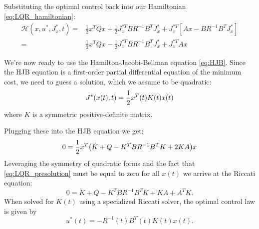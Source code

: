 \documentclass[../root.tex]{subfiles}
\begin{document}
        Substituting the optimal control back into our Hamiltonian \eqref{eq:LQR_hamiltonian}:
        \begin{equation}
            \begin{aligned}
                \mathcal{H}(x,u^*,J_x^*,t) =& \frac{1}{2} x^T Q x 
                    + \frac{1}{2} J_x^{*T} B R^{-1}B^T J_x^* 
                    + J_x^{*T} [Ax - B R^{-1} B^T J_x^*] \\
                =& \frac{1}{2} x^T Q x 
                    - \frac{1}{2} J_x^{*T} B R^{-1}B^T J_x^* 
                    + J_x^{*T} Ax
            \end{aligned}
        \end{equation}

        We're now ready to use the Hamilton-Jacobi-Bellman equation \eqref{eq:HJB}.
        Since the HJB equation is a first-order partial differential equation of the
        minimum cost, we need to guess a solution, which we assume to be quadratic:
        \begin{equation}
            J^*(x(t),t) = \frac{1}{2} x^T(t) K(t) x(t)
        \end{equation}
        where $K$ is a symmetric positive-definite matrix.

        Plugging these into the HJB equation we get:
        \begin{equation} \label{eq:LQR_presolution}
            \begin{aligned}
                0 = \frac{1}{2} x^T \big(\dot{K} + Q - K^T B R^{-1}B^T K + 2 K A \big) x \\
            \end{aligned}
        \end{equation}
        Leveraging the symmetry of quadratic forms and the fact that
        \eqref{eq:LQR_presolution} must be equal to zero for all $x(t)$ we arrive at
        the Riccati equation:
        \begin{equation}
            0 = \dot{K} + Q - K^T B R^{-1}B^T K + K A + A^T K.
        \end{equation}
        When solved for $K(t)$ using a specialized Riccati solver, the optimal control law is given by
        \begin{equation}
            u^*(t) = -R^{-1}(t)B^T(t)K(t)x(t).
        \end{equation}
\end{document}
